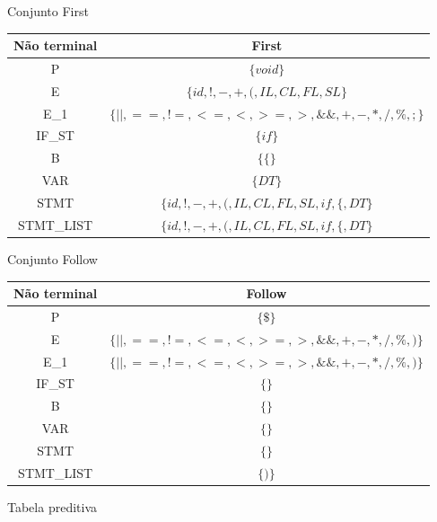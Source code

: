 \documentclass[]{article}
\numberwithin{equation}{section}
\begin{document}
Conjunto First

\begin{center}
\begin{tabular}{|c|c|}
  \hline
  Não terminal & First \\ \hline
  P & $\{void\}$ \\ \hline
  E & $\{id, !, -, +, (, IL, CL, FL, SL\}$ \\ \hline
  E\_1 & $\{||, ==, !=, <=, <, >=, >, \&\&, +, -, *, /, \%, ;\}$ \\ \hline
  IF\_ST & $\{if\}$ \\ \hline
  B & $\{\{\}$ \\ \hline
  VAR & $\{DT\}$ \\ \hline
  STMT & $\{id, !, -, +, (, IL, CL, FL, SL, if, \{, DT\}$ \\ \hline
  STMT\_LIST & $\{id, !, -, +, (, IL, CL, FL, SL, if, \{, DT\}$  \\ \hline
\end{tabular}
\end{center}

Conjunto Follow

\begin{center}
\begin{tabular}{|c|c|}
  \hline
  Não terminal & Follow \\ \hline
  P & $\{\$\}$ \\ \hline
  E & $\{||, ==, !=, <=, <, >=, >, \&\&, +, -, *, /, \%, )\}$ \\ \hline
  E\_1 & $\{||, ==, !=, <=, <, >=, >, \&\&, +, -, *, /, \%, )\}$ \\ \hline
  IF\_ST & $\{\}$ \\ \hline
  B & $\{\}$ \\ \hline
  VAR & $\{\}$ \\ \hline
  STMT & $\{\}$  \\ \hline
  STMT\_LIST & $\{)\}$   \\ \hline
\end{tabular}
\end{center}

\newpage

Tabela preditiva
\end{document}
